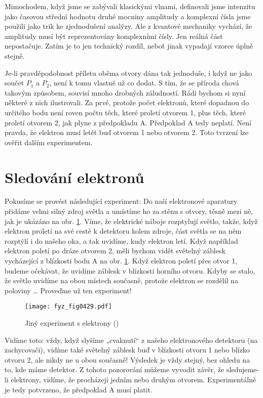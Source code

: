     Mimochodem, když jsme se zabývali klasickými vlnami, definovali jsme intenzitu jako časovou
    střední hodnotu druhé mocniny amplitudy a komplexní čísla jsme použili jako trik ke zjednodušení
    analýzy. Ale z kvantové mechaniky vychází, že amplitudy musí být reprezentovány komplexními
    čísly. Jen reálná část nepostačuje. Zatím je to jen technický rozdíl, neboť jinak vypadají
    vzorce úplně stejně.
    
    Je-li pravděpodobnost příletu oběma otvory dána tak jednoduše, i když ne jako součet \(P_1\)  a
    \(P_2\), není k tomu vlastně už co dodat. S tím, že se příroda chová takovým způsobem, souvisí
    mnoho drobných záludností. Rádi bychom si nyní některé z nich ilustrovali. Za prvé, protože
    počet elektronů, které dopadnou do určitého bodu není roven počtu těch, které proletí otvorem 1,
    plus těch, které proletí otvorem 2, jak plyne z předpokladu A. Předpoklad A tedy neplatí. Není
    pravda, že elektron musí letět buď otvorem 1 nebo otvorem 2. Toto tvrzení lze ověřit dalším
    experimentem.
      
  \section{Sledování elektronů}\label{fyz:IchapXXXVIIsecVI}
    Pokusíme se provést následující experiment: Do naší elektronové aparatury přidáme velmi silný
    zdroj světla a umístíme ho za stěnu s otvory, těsně mezi ně, jak je ukázáno na obr.
    \ref{fyz:fig0429}. Víme, že elektrické náboje rozptylují světlo, takže, když elektron proletí na
    své cestě k detektoru kolem zdroje, část světla se na něm rozptýlí i do našeho oka, a tak
    uvidíme, kudy elektron letí. Když například elektron poletí po dráze otvorem 2, měli bychom
    vidět světelný záblesk vycházející z blízkosti bodu A na obr. \ref{fyz:fig0429}. Když elektron
    poletí přes otvor 1, budeme očekávat, že uvidíme záblesk v blízkosti horního otvoru. Kdyby se
    stalo, že světlo uvidíme na obou místech současně, protože elektron se rozdělil na poloviny …
    Proveďme už ten experiment!
    \begin{figure}[ht!] %
      \centering
      \texttt{[image: fyz\_fig0429.pdf]}
      \caption{Jiný experiment s elektrony (\cite[s.~697]{Feynman01})}
      \label{fyz:fig0429}
    \end{figure}

    Vidíme toto: vždy, když slyšíme „cvaknutí“ z našeho elektronového detektoru (na zachycovači),
    vidíme také světelný záblesk buď v blízkosti otvoru 1 nebo blízko otvoru 2, ale nikdy ne u obou
    současně! Výsledek je vždy stejný, bez ohledu na to, kde máme detektor. Z tohoto pozorování
    můžeme vyvodit závěr, že sledujeme-li elektrony, vidíme, že procházejí jedním nebo druhým
    otvorem. Experimentálně je tedy potvrzeno, že předpoklad A musí platit.
    
